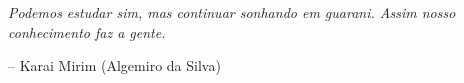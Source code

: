 \chapter*{}

\vspace*{\fill}

\epigraph{\emph{Podemos estudar sim, mas continuar sonhando em guarani. Assim nosso conhecimento faz a gente.}}{-- Karai Mirim (Algemiro da Silva)}

\thispagestyle{empty}